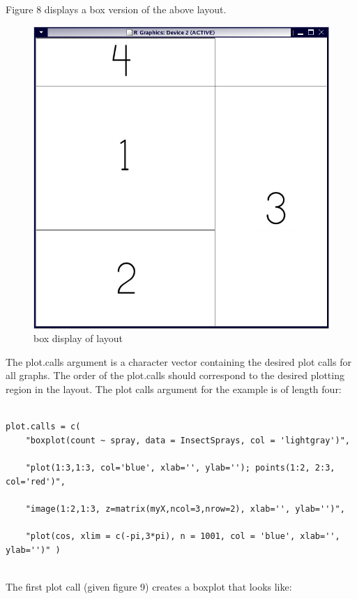 \documentclass[]{article}
\begin{document}
\indent Figure 8 displays a box version of the above layout.
\begin{center}
\begin{figure}
\includegraphics{LayoutFig}
\caption{box display of layout}
\end{figure}
\end{center}


\indent The plot.calls argument is a character vector containing the desired plot calls for all graphs. The order of the plot.calls should correspond to the desired plotting region in the layout. The plot calls argument for the example is of length four:


\begin{verbatim}

plot.calls = c(
    "boxplot(count ~ spray, data = InsectSprays, col = 'lightgray')",

    "plot(1:3,1:3, col='blue', xlab='', ylab=''); points(1:2, 2:3, col='red')", 

    "image(1:2,1:3, z=matrix(myX,ncol=3,nrow=2), xlab='', ylab='')",

    "plot(cos, xlim = c(-pi,3*pi), n = 1001, col = 'blue', xlab='', ylab='')" )


\end{verbatim}


\indent The first plot call (given figure 9) creates a boxplot that looks like:
\end{document}
